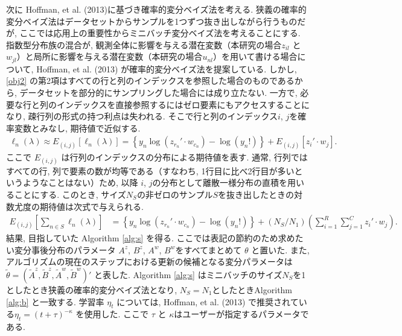 \documentclass[a4paper,12pt]{jsarticle} %
\numberwithin{equation}{section} %
\begin{document}
次に Hoffman, et al. (2013)に基づき確率的変分ベイズ法を考える.
狭義の確率的変分ベイズ法はデータセットからサンプルを1つずつ抜き出しながら行うものだが, ここでは応用上の重要性からミニバッチ変分ベイズ法を考えることにする. 
指数型分布族の混合が, 観測全体に影響を与える潜在変数（本研究の場合$z_{il}$ と $w_{jl}$）と局所に影響を与える潜在変数（本研究の場合$u_{nl}$）を用いて書ける場合について, Hoffman, et al. (2013) が確率的変分ベイズ法を提案している. 
しかし,  \eqref{obj2} の第2項はすべての行と列のインデックスを参照した場合のものであるから, データセットを部分的にサンプリングした場合には成り立たない. 一方で, 必要な行と列のインデックスを直接参照するにはゼロ要素にもアクセスすることになり, 疎行列の形式の持つ利点は失われる. そこで行と列のインデックス$i$, $j$を確率変数とみなし, 期待値で近似する. 
\begin{align}
\ell_n (\lambda) \approx E_{(i,j)} [\ell_n (\lambda)] = \left\{ y_n \log(z_{r_n}' \cdot w_{c_n})  - \log(y_n!) \right\} + E_{(i,j)} [z_{i}' \cdot w_{j}].
\end{align}
ここで $E_{(i,j)}$ は行列のインデックスの分布による期待値を表す. 通常, 行列ではすべての行, 列で要素の数が均等である（すなわち, 1行目に比べ2行目が多いというようなことはない）ため, 以降 $i$, $j$の分布として離散一様分布の直積を用いることにする. このとき, サイズ$N_S$の非ゼロのサンプル$S$を抜き出したときの対数尤度の期待値は次式で与えられる.
\begin{align}
E_{(i,j)} [\sum_{n \in S}  \ell_n (\lambda)] & = \left\{ y_n \log(z_{r_n}' \cdot w_{c_n})  - \log(y_n!) \right\} + (N_S/N_1)\left(\sum_{i=1}^R \sum_{j=1}^C z_{i}' \cdot w_{j} \right).
\end{align}
結果, 目指していた Algorithm \ref{alg:s} を得る. ここでは表記の節約のため求めたい変分事後分布のパラメータ $A^z$, $B^z$, $A^w$, $B^w$をすべてまとめて $\theta$ と置いた. また, アルゴリズムの現在のステップにおける更新の候補となる変分パラメータは $\tilde \theta =(\tilde A^z, \tilde B^z, \tilde A^w, \tilde B^w)'$ と表した. 
Algorithm \ref{alg:s} はミニバッチのサイズ$N_S$を1としたとき狭義の確率的変分ベイズ法となり, $N_S=N_1$としたときAlgorithm \ref{alg:b} と一致する.
学習率 $\eta_t$ については, Hoffman, et al. (2013) で推奨されている$\eta_t = (t+\tau)^{-\kappa}$ を使用した. ここで $\tau$ と $\kappa$はユーザーが指定するパラメータである.
\end{document}
